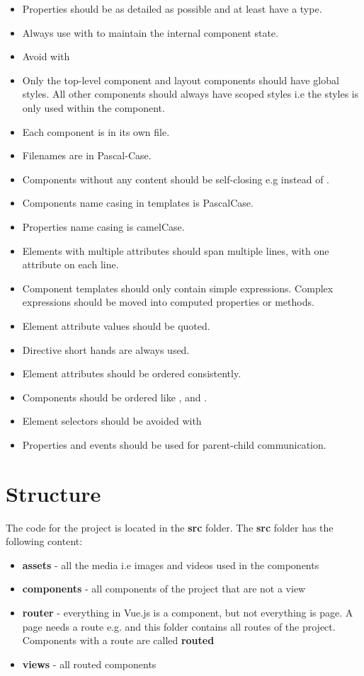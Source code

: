 \begin{itemize}
    \item Properties should be as detailed as possible and at least have a type.
    \item Always use  with  to maintain the internal component state.
    \item Avoid  with 
    \item Only the top-level  component and layout components should have global styles. All other components should always have scoped styles i.e the styles is only used within the component.
    \item Each component is in its own file.
    \item Filenames are in Pascal-Case.
    \item Components without any content should be self-closing e.g  instead of .
    \item Components name casing in templates is PascalCase.
    \item Properties name casing is camelCase.
    \item Elements with multiple attributes should span multiple lines, with one attribute on each line.
    \item Component templates should only contain simple expressions. Complex expressions should be moved into computed properties or methods.
    \item Element attribute values should be quoted.
    \item Directive short hands are always used.
    \item Element attributes should be ordered consistently.
    \item Components should be ordered like ,  and .
    \item Element selectors should be avoided with 
    \item Properties and events should be used for parent-child communication.
\end{itemize}

\section{Structure}
\label{section:structure}
The code for the project is located in the \textbf{src} folder. The \textbf{src} folder has the following content: 

\begin{itemize}
    \item \textbf{assets} - all the media i.e images and videos used in the components
    \item \textbf{components} - all components of the project that are not a view
    \item \textbf{router} - everything in Vue.js is a component, but not everything is page. A page needs a route e.g.  and this folder contains all routes of the project. Components with a route are called \textbf{routed}
    \item \textbf{views} - all routed components
\end{itemize}

